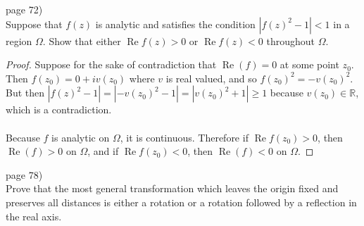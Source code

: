 \documentclass{article}
\newenvironment{problem}[2][Problem]{\begin{trivlist}
\item[\hskip \labelsep {\bfseries #1}\hskip \labelsep {\bfseries #2.}]}{\end{trivlist}}
\begin{document}
\pagebreak

\begin{problem}{3} (page 72) \\
  Suppose that $f(z)$ is analytic and satisfies the condition $|f(z)^2 - 1| < 1$
  in a region $\Omega$.
  Show that either $\operatorname{Re} f(z) > 0$ or $\operatorname{Re} f(z) < 0$
  throughout $\Omega$.
\end{problem}

\begin{proof}
  Suppose for the sake of contradiction that $\operatorname{Re}(f) = 0$ at some
  point $z_0$. Then $f(z_0) = 0 + iv(z_0)$ where $v$ is real valued, and so
  $f(z_0)^2 = -v(z_0)^2$. But then $|f(z)^2 - 1| = |-v(z_0)^2 - 1| = |v(z_0)^2 + 1| \geq 1$
  because $v(z_0) \in \mathbb{R}$, which is a contradiction.\\
  \\
  Because $f$ is analytic on $\Omega$, it is continuous. Therefore if
  $\operatorname{Re} f(z_0) > 0$, then $\operatorname{Re}(f) > 0$ on $\Omega$, and if
  $\operatorname{Re} f(z_0) < 0$, then $\operatorname{Re}(f) < 0$ on $\Omega$.
\end{proof}

\pagebreak

\begin{problem}{3} (page 78) \\
  Prove that the most general transformation which leaves the origin fixed and
  preserves all distances is either a rotation or a rotation followed by a
  reflection in the real axis.
\end{problem}
\end{document}
